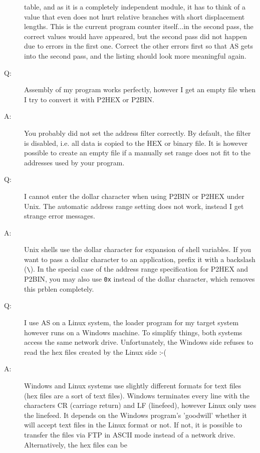 \documentclass[12pt,twoside]{report}
\newcommand{\tty}[1]{{\tt #1}}
\begin{document}
\begin{description}
{   table, and as it is a completely independent module, it has to think of
   a value that even does not hurt relative branches with short displacement
   lengths.  This is the current program counter itself...in the
   second pass, the correct values would have appeared, but the second
   pass did not happen due to errors in the first one.  Correct the
   other errors first so that AS gets into the second pass, and the
   listing should look more meaningful again.}
\vspace{0.3cm}
\item[Q:]{Assembly of my program works perfectly, however I get an empty
   file when I try to convert it with P2HEX or P2BIN.}
\item[A:]{You probably did not set the address filter correctly.  By
   default, the filter is disabled, i.e. all data is copied to the
   HEX or binary file.  It is however possible to create an empty file
   if a manually set range does not fit to the addresses used by your
   program.}
\vspace{0.3cm}
\item[Q:]{I cannot enter the dollar character when using P2BIN or P2HEX
   under Unix.  The automatic address range setting does not work, instead
   I get strange error messages.}
\item[A:]{Unix shells use the dollar character for expansion of shell
   variables.  If you want to pass a dollar character to an application,
   prefix it with a backslash (\verb!\!).  In the special case of the
   address range specification for P2HEX and P2BIN, you may also use
   \tty{0x} instead of the dollar character, which removes this prblen
   completely.}
\item[Q:]{I use AS on a Linux system, the loader program for my target
          system however runs on a Windows machine. To simplify things,
          both systems access the same network drive.  Unfortunately, the
          Windows side refuses to read the hex files created by the Linux
          side :-(}
\item[A:]{Windows and Linux systems use slightly different formats for
          text files (hex files are a sort of text files).  Windows
          terminates every line with the characters CR (carriage return)
          and LF (linefeed), however Linux only uses the linefeed.  It
          depends on the Windows program's 'goodwill' whether it will
          accept text files in the Linux format or not.  If not, it is
          possible to transfer the files via FTP in ASCII mode instead
          of a network drive.  Alternatively, the hex files can be
}
\end{description}
\end{document}
